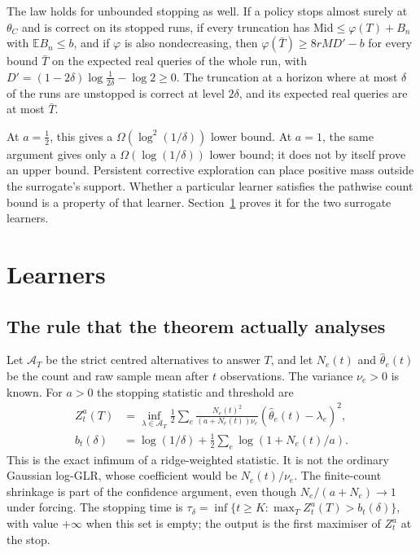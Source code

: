 
The law holds for unbounded stopping as well. If a policy stops almost surely at $\theta_C$ and is
correct on its stopped runs, if every truncation has $\mathrm{Mid}\le\varphi(T)+B_n$ with
$\mathbb EB_n\le b$, and if $\varphi$ is also nondecreasing, then
$\varphi(\bar T)\ge8rMD'-b$ for every bound $\bar T$ on the expected real queries of the whole
run, with $D'=(1-2\delta)\log\frac1{2\delta}-\log2\ge0$. The truncation at a horizon where at most
$\delta$ of the runs are unstopped is correct at level $2\delta$, and its expected real queries are
at most $\bar T$.

At $a=\frac12$, this gives a $\Omega(\log^{2}(1/\delta))$ lower bound. At $a=1$, the
same argument gives only a $\Omega(\log(1/\delta))$ lower bound; it does not by itself
prove an upper bound. Persistent corrective exploration can place positive mass outside the
surrogate's support. Whether a particular learner satisfies the pathwise count bound is a
property of that learner. Section~\ref{sec:learners} proves it for the two surrogate learners.

\section{Learners}
\label{sec:learners}

\subsection{The rule that the theorem actually analyses}
Let $\mathcal A_T$ be the strict centred alternatives to answer $T$, and let $N_e(t)$ and
$\widehat\theta_e(t)$ be the count and raw sample mean after $t$ observations. The variance
$\nu_e>0$ is known. For $a>0$ the stopping statistic and threshold are
\begin{align}
Z_t^a(T)&=\inf_{\lambda\in\mathcal A_T}
 \frac12\sum_e\frac{N_e(t)^2}{(a+N_e(t))\nu_e}
 (\widehat\theta_e(t)-\lambda_e)^2,\label{eq:ridgestop}\\
b_t(\delta)&=\log(1/\delta)+\frac12\sum_e\log(1+N_e(t)/a).
\label{eq:idealboundary}
\end{align}
This is the exact infimum of a ridge-weighted statistic. It is not the ordinary Gaussian
log-GLR, whose coefficient would be $N_e(t)/\nu_e$. The finite-count shrinkage is part of
the confidence argument, even though $N_e/(a+N_e)\to1$ under forcing.
The stopping time is
$\tau_\delta=\inf\{t\ge K:\max_T Z_t^a(T)>b_t(\delta)\}$, with value $+\infty$ when this set
is empty; the output is the first maximiser of $Z_t^a$ at the stop.

